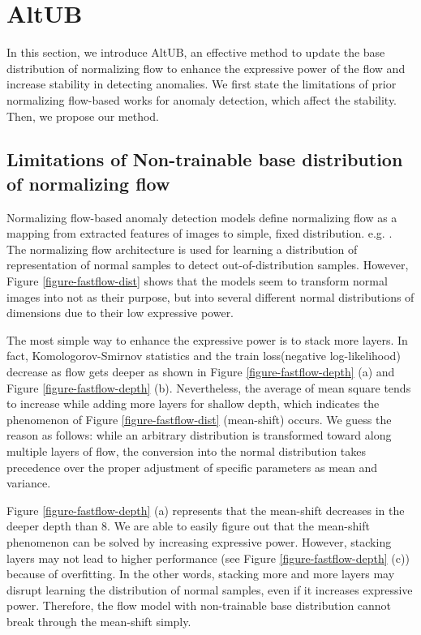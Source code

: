 \documentclass[letterpaper]{article}
\begin{document}
\section{AltUB}
In this section, we introduce AltUB, an effective method to update the base distribution of normalizing flow to enhance the expressive power of the flow and increase stability in detecting anomalies. We first state the limitations of prior normalizing flow-based works for anomaly detection, which affect the stability. Then, we propose our method.

\subsection{Limitations of Non-trainable base distribution of normalizing flow}
\label{sec4.1}
Normalizing flow-based anomaly detection models \cite{rudolph1, yu1, gudovskiy1} define normalizing flow  as a mapping from extracted features of images to simple, fixed distribution. e.g. . The normalizing flow architecture is used for learning a distribution of representation of normal samples to detect out-of-distribution samples. However, Figure \ref{figure-fastflow-dist} shows that the models seem to transform normal images into not  as their purpose, but into several different normal distributions of  dimensions due to their low expressive power. 

The most simple way to enhance the expressive power is to stack more layers. In fact, Komologorov-Smirnov statistics and the train loss(negative log-likelihood) decrease as flow gets deeper as shown in Figure \ref{figure-fastflow-depth} (a) and Figure \ref{figure-fastflow-depth} (b). Nevertheless, the average of mean square tends to increase while adding more layers for shallow depth, which indicates the phenomenon of Figure \ref{figure-fastflow-dist} (mean-shift) occurs. We guess the reason as follows: while an arbitrary distribution is transformed toward  along multiple layers of flow, the conversion into the normal distribution takes precedence over the proper adjustment of specific parameters as mean and variance.

Figure \ref{figure-fastflow-depth} (a) represents that the mean-shift decreases in the deeper depth than 8. We are able to easily figure out that the mean-shift phenomenon can be solved by increasing expressive power. However, stacking layers may not lead to higher performance (see Figure \ref{figure-fastflow-depth} (c)) because of overfitting. In the other words, stacking more and more layers may disrupt learning the distribution of normal samples, even if it increases expressive power. Therefore, the flow model with non-trainable base distribution cannot break through the mean-shift simply.
\end{document}
